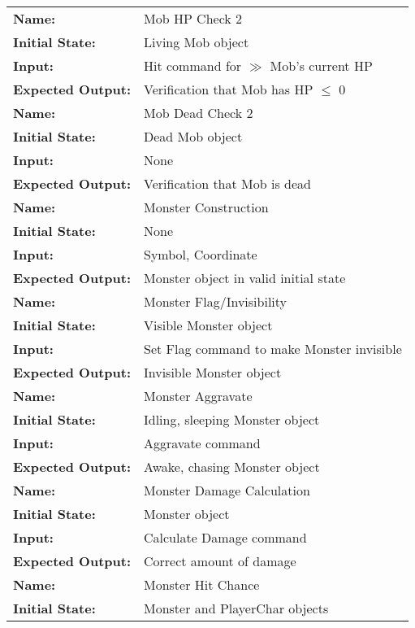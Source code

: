 \documentclass[12pt, titlepage]{article}
\begin{document}
\begin{center}
\begin{longtable}{ l | p{10cm} }
				\hline
				\rule{0pt}{1.5em}\textbf{Name:} & Mob HP Check 2\\
				\textbf{Initial State:} & Living Mob object\\
				\textbf{Input:} & Hit command for $\gg$ Mob's current HP\\
				\textbf{Expected Output:} & Verification that Mob has HP $\le$ 0\\[0.6em]
				\hline
				\rule{0pt}{1.5em}\textbf{Name:} & Mob Dead Check 2\\
				\textbf{Initial State:} & Dead Mob object\\
				\textbf{Input:} & None\\
				\textbf{Expected Output:} & Verification that Mob is dead\\[0.6em]
				\hline
				\rule{0pt}{1.5em}\textbf{Name:} & Monster Construction\\
				\textbf{Initial State:} & None\\
				\textbf{Input:} & Symbol, Coordinate\\
				\textbf{Expected Output:} & Monster object in valid initial state\\[0.6em]
				\hline
				\rule{0pt}{1.5em}\textbf{Name:} & Monster Flag/Invisibility\\
				\textbf{Initial State:} & Visible Monster object\\
				\textbf{Input:} & Set Flag command to make Monster invisible\\
				\textbf{Expected Output:} & Invisible Monster object\\[0.6em]
				\hline
				\rule{0pt}{1.5em}\textbf{Name:} & Monster Aggravate\\
				\textbf{Initial State:} & Idling, sleeping Monster object\\
				\textbf{Input:} & Aggravate command\\
				\textbf{Expected Output:} & Awake, chasing Monster object\\[0.6em]
				\hline
				\rule{0pt}{1.5em}\textbf{Name:} & Monster Damage Calculation\\
				\textbf{Initial State:} & Monster object\\
				\textbf{Input:} & Calculate Damage command\\
				\textbf{Expected Output:} & Correct amount of damage\\[0.6em]
				\hline
				\rule{0pt}{1.5em}\textbf{Name:} & Monster Hit Chance\\
				\textbf{Initial State:} & Monster and PlayerChar objects\\

\end{longtable}
\end{center}
\end{document}
